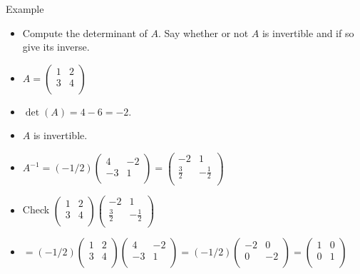 \documentclass{beamer}
\begin{document}
\begin{frame}{Example}

\begin{itemize}
\item Compute the determinant of $A$. Say whether or not $A$ is invertible
and if so give its inverse.
\item
$
A =
\begin{pmatrix}
1 & 2 \\
3 & 4 \\
\end{pmatrix}
$
\item $\det(A) = 4 - 6 = -2$.
\item $A$ is invertible.
\item $
A^{-1} =
(-1/2)
\begin{pmatrix}
4 & -2 \\
-3 & 1 \\
\end{pmatrix}
=
\begin{pmatrix}
-2 & 1 \\
\frac{3}{2} & -\frac{1}{2} \\
\end{pmatrix}
$
\item Check
$
\begin{pmatrix}
1 & 2 \\
3 & 4 \\
\end{pmatrix}
\begin{pmatrix}
-2 & 1 \\
\frac{3}{2} & -\frac{1}{2} \\
\end{pmatrix}
$
\item
$
= (-1/2)
\begin{pmatrix}
1 & 2 \\
3 & 4 \\
\end{pmatrix}
\begin{pmatrix}
4 & -2 \\
-3 & 1 \\
\end{pmatrix}
=
(-1/2)
\begin{pmatrix}
-2 & 0 \\
0 & -2\\
\end{pmatrix}
=
\begin{pmatrix}
1 & 0 \\
0 & 1\\
\end{pmatrix}
$
\end{itemize}
\end{frame}
\end{document}
